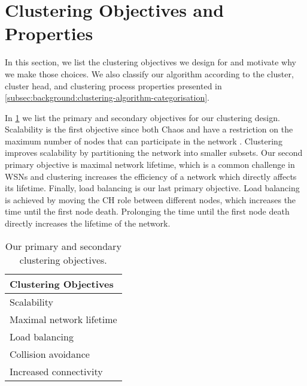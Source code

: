 \section{Clustering Objectives and Properties}
In this section, we list the clustering objectives we design for and motivate why we make those choices. We also classify our algorithm according to the cluster, cluster head, and clustering process properties presented in \cref{subsec:background:clustering-algorithm-categorisation}.

In \cref{fig:primary-and-secondary-objectives} we list the primary and secondary objectives for our clustering design. Scalability is the first objective since both Chaos and \atwo{} have a restriction on the maximum number of nodes that can participate in the network \cite{chaos-introduction-paper}. Clustering improves scalability by partitioning the network into smaller subsets. Our second primary objective is maximal network lifetime, which is a common challenge in WSNs \cite{Afsar2014-clustering-survey, NikolaosA.Pantaziz2007-wsn-power-survey} and clustering increases the efficiency of a network which directly affects its lifetime. Finally, load balancing is our last primary objective. Load balancing is achieved by moving the CH role between different nodes, which increases the time until the first node death. Prolonging the time until the first node death directly increases the lifetime of the network.

\begin{table}[bt]
    \centering
    \caption{Our primary and secondary clustering objectives.}
    \begin{tabular}{l}
        \textbf{Clustering Objectives}    \\ \hline
        Scalability              \\
        Maximal network lifetime \\
        Load balancing           \\
        Collision avoidance      \\
        Increased connectivity  
    \end{tabular}
    \label{fig:primary-and-secondary-objectives}
\end{table}

